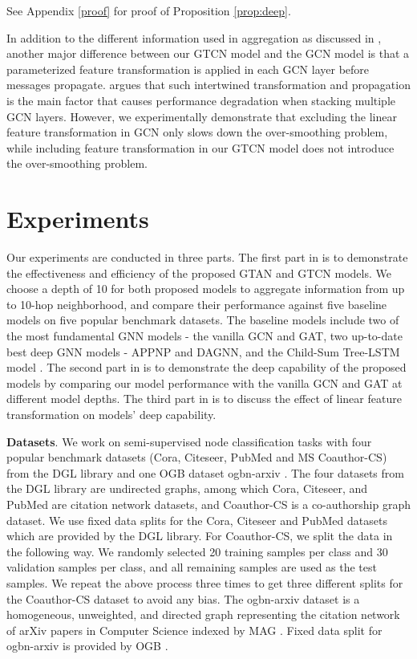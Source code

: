 \documentclass[lettersize,journal]{IEEEtran}
\theoremstyle{plain}
\theoremstyle{definition}
\theoremstyle{remark}
\begin{document}
See Appendix \ref{proof} for proof of Proposition \ref{prop:deep}.

In addition to the different information used in aggregation as discussed in , another major difference between our GTCN model and the GCN model is that a parameterized feature transformation is applied in each GCN layer before messages propagate. \cite{liu2020towards} argues that such intertwined transformation and propagation is the main factor that causes performance degradation when stacking multiple GCN layers. However, we experimentally demonstrate that excluding the linear feature transformation in GCN only slows down the over-smoothing problem, while including feature transformation in our GTCN model does not introduce the over-smoothing problem.

\section{Experiments}
\label{exp}

Our experiments are conducted in three parts. The first part in  is to demonstrate the effectiveness and efficiency of the proposed GTAN and GTCN models. We choose a depth of 10 for both proposed models to aggregate information from up to 10-hop neighborhood, and compare their performance against five baseline models on five popular benchmark datasets. The baseline models include two of the most fundamental GNN models - the vanilla GCN and GAT, two up-to-date best deep GNN models - APPNP and DAGNN, and the Child-Sum Tree-LSTM model \cite{tai2015improved}. The second part in  is to demonstrate the deep capability of the proposed models by comparing our model performance with the vanilla GCN and GAT at different model depths. The third part in  is to discuss the effect of linear feature transformation on models' deep capability.

\textbf{Datasets}. We work on semi-supervised node classification tasks with four popular benchmark datasets (Cora, Citeseer, PubMed and MS Coauthor-CS) from the DGL library \cite{wang2019dgl} and one OGB dataset ogbn-arxiv \cite{hu2020ogb}. The four datasets from the DGL library are undirected graphs, among which Cora, Citeseer, and PubMed are citation network datasets, and Coauthor-CS is a co-authorship graph dataset. We use fixed data splits for the Cora, Citeseer and PubMed datasets which are provided by the DGL library. For Coauthor-CS, we split the data in the following way. We randomly selected 20 training samples per class and 30 validation samples per class, and all remaining samples are used as the test samples. We repeat the above process three times to get three different splits for the Coauthor-CS dataset to avoid any bias. The ogbn-arxiv dataset is a homogeneous, unweighted, and directed graph representing the citation network of arXiv papers in Computer Science indexed by MAG \cite{wang2020microsoft}. Fixed data split for ogbn-arxiv is provided by OGB \cite{hu2020ogb}.
\end{document}
